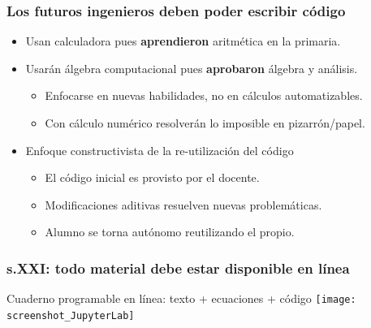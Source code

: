 \documentclass[aspectratio=43]{beamer}
\begin{document}
\begin{frame}
	\frametitle{Los futuros ingenieros deben poder escribir código}
	\pause
	\begin{block}{}
		\begin{itemize}[<+->]
			\item Usan calculadora pues \textbf{aprendieron} aritmética en la primaria.
			\item Usarán álgebra computacional pues \textbf{aprobaron} álgebra y análisis.
			\begin{itemize}[<+->]
				\item Enfocarse en nuevas habilidades, no en cálculos automatizables.
				\item Con cálculo numérico resolverán lo imposible en pizarrón/papel.
			\end{itemize}
			\item Enfoque constructivista de la re-utilización del código
			\begin{itemize}[<+->]
				\item El código inicial es provisto por el docente.
				\item Modificaciones aditivas resuelven nuevas problemáticas.
				\item Alumno se torna autónomo reutilizando el propio.
			\end{itemize}
		\end{itemize}
	\end{block}
\end{frame}


\begin{frame}
	\frametitle{s.XXI: todo material debe estar disponible en línea}
	\pause
	\begin{block}{Cuaderno programable en línea: texto + ecuaciones + código}
		\texttt{[image: screenshot\_JupyterLab]}
	\end{block}
\end{frame}
\end{document}
